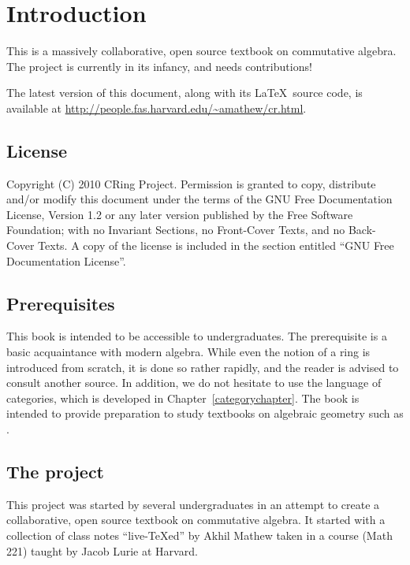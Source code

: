 
\nocite{*}

\chapter*{Introduction}

This is a massively collaborative, open source textbook on commutative
algebra. The project is currently in its infancy, and needs contributions!

The latest version of this document, along with its \LaTeX\ source code, is
available at \url{http://people.fas.harvard.edu/~amathew/cr.html}.

\section*{License}

Copyright (C) 2010 CRing Project.  Permission is granted to copy, distribute
and/or modify this document under the terms of the GNU Free Documentation
License, Version 1.2 or any later version published by the Free Software
Foundation; with no Invariant Sections, no Front-Cover Texts, and no
Back-Cover Texts. A copy of the license is included in the section entitled
``GNU Free Documentation License''.

\section*{Prerequisites}

This book is intended to be accessible to undergraduates. The prerequisite is
a basic acquaintance with modern algebra. While even the notion of a ring is
introduced from scratch, it is done so rather rapidly, and the reader is
advised to consult another source. In addition, we do not hesitate to use the
language of categories, which is developed in Chapter~\ref{categorychapter}.
The book is intended to provide preparation to study textbooks on algebraic
geometry such as \cite{Ha77}.

\section*{The project}

This project was started by several undergraduates in an attempt to create
a collaborative, open source textbook on commutative algebra.  It started with
a collection of class notes ``live-\TeX ed'' by Akhil Mathew taken in a course
(Math 221) taught by Jacob Lurie at Harvard.

